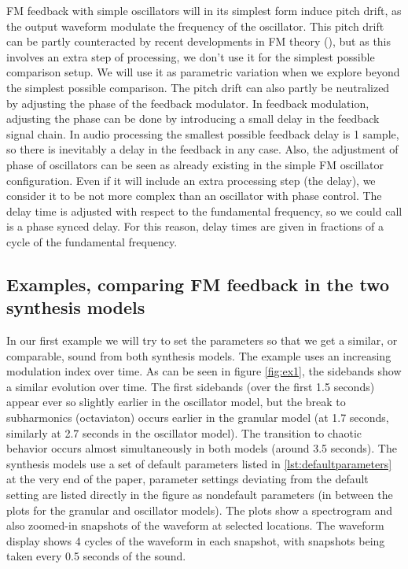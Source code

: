 \documentclass[runningheads,a4paper]{llncs}
\begin{document}
FM feedback with simple oscillators will in its simplest form induce pitch drift, as the output waveform modulate the frequency of the oscillator. This pitch drift can be partly counteracted by recent developments in FM theory (\cite{Lazzarini-2024}), but as this involves an extra step of processing, we don't use it for the simplest possible comparison setup. We will use it as parametric variation when we explore beyond the simplest possible comparison. The pitch drift can also partly be neutralized by adjusting the phase of the feedback modulator. In feedback modulation, adjusting the phase can be done by introducing a small delay in the feedback signal chain. In audio processing the smallest possible feedback delay is 1 sample, so there is inevitably a delay in the feedback in any case. Also, the adjustment of phase of oscillators can be seen as already existing in the simple FM oscillator configuration. Even if it will include an extra processing step (the delay), we consider it to be not more complex than an oscillator with phase control. The delay time is adjusted with respect to the fundamental frequency, so we could call is a phase synced delay. For this reason, delay times are given in fractions of a cycle of the fundamental frequency. 

\subsection{Examples, comparing FM feedback in the two synthesis models}
In our first example we will try to set the parameters so that we get a similar, or comparable, sound from both synthesis models. The example uses an increasing modulation index over time. As can be seen in figure \ref{fig:ex1}, the sidebands show a similar evolution over time. The first sidebands (over the first 1.5 seconds) appear ever so slightly earlier in the oscillator model, but the break to subharmonics (octaviaton) occurs earlier in the granular model (at 1.7 seconds, similarly at 2.7 seconds in the oscillator model). The transition to chaotic behavior occurs almost simultaneously in both models (around 3.5 seconds). The synthesis models use a set of default parameters listed in \ref{lst:defaultparameters} at the very end of the paper, parameter settings deviating from the default setting are listed directly in the figure as nondefault parameters (in between the plots for the granular and oscillator models). The plots show a spectrogram and also zoomed-in snapshots of the waveform at selected locations. The waveform display shows 4 cycles of the waveform in each snapshot, with snapshots being taken every 0.5 seconds of the sound.
\end{document}
